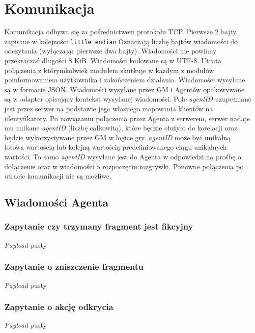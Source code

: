 \documentclass[Dokumentacja.tex]{subfiles}
\begin{document}
\section{Komunikacja}
\label{sec:komunikacja}

Komunikacja odbywa się za pośrednictwem protokołu TCP. Pierwsze 2 bajty zapisane w kolejności \texttt{little endian}
Oznaczają liczbę bajtów wiadomości do odczytania (wyłączając pierwsze dwa bajty).
Wiadomości nie powinny przekraczać długości 8 KiB. Wiadomości kodowane są w UTF-8.
Utrata połączenia z którymkolwiek modułem skutkuje w każdym z modułów
poinformowaniem użytkownika i zakończeniem działania. Wiadomości wysyłane są w formacie JSON.
Wiadomości wysyłane przez GM i Agentów opakowywane są w adapter opisujący kontekst wysyłanej wiadomości.
Pole \textit{agentID} uzupełniane jest przez serwer na podstawie jego własnego mapowania
klientów na identyfikatory. Po nawiązaniu połączenia przez Agenta z serwerem,
serwer nadaje mu unikane \textit{agentID} (liczbę całkowitą), które będzie służyło do korelacji oraz będzie
wykorzystywane przez GM w logice gry.
\textit{agentID} może być unikalną losowa wartością lub kolejną wartością predefiniowanego ciągu
unikalnych wartości. To samo \textit{agentID}
wysyłane jest do Agenta w odpowiedzi na prośbę o dołączenie
oraz w wiadomości o rozpoczęciu rozgrywki. Ponowne połączenia po utracie komunikacji nie są możliwe.


\subsection{Wiadomości Agenta}
\subsubsection{Zapytanie czy trzymany fragment jest fikcyjny}
\textit{Payload} pusty


\subsubsection{Zapytanie o zniszczenie fragmentu}
\textit{Payload} pusty


\subsubsection{Zapytanie o akcję odkrycia}
\textit{Payload} pusty

\end{document}
